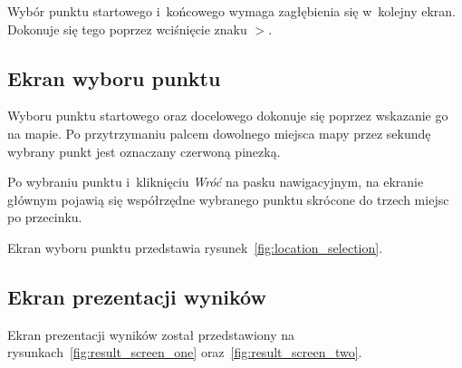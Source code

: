 \documentclass[a4paper,12pt]{article}
\begin{document}
	Wybór punktu startowego i~końcowego wymaga zagłębienia się w~kolejny ekran. Dokonuje się tego poprzez wciśnięcie znaku $>$.

	\subsection*{Ekran wyboru punktu}

	Wyboru punktu startowego oraz docelowego dokonuje się poprzez wskazanie go na mapie. Po przytrzymaniu palcem dowolnego miejsca mapy przez sekundę wybrany punkt jest oznaczany czerwoną pinezką.

	Po wybraniu punktu i~kliknięciu \emph{Wróć} na pasku nawigacyjnym, na ekranie głównym pojawią się współrzędne wybranego punktu skrócone do trzech miejsc po przecinku.

	Ekran wyboru punktu przedstawia rysunek~\ref{fig:location_selection}.

	\subsection*{Ekran prezentacji wyników}

	Ekran prezentacji wyników został przedstawiony na rysunkach~\ref{fig:result_screen_one} oraz~\ref{fig:result_screen_two}.
\end{document}
